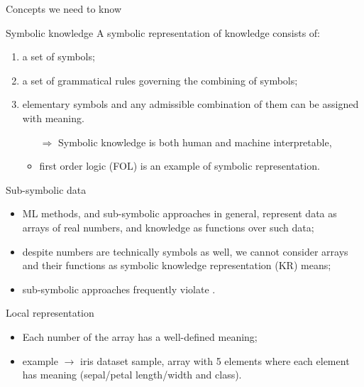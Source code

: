 \documentclass[presentation]{beamer}\mode<presentation>{\usetheme{AMSBolognaFC}}
\begin{document}
\begin{frame}[allowframebreaks]{Concepts we need to know}

    \begin{block}{Symbolic knowledge}
        A symbolic representation of knowledge consists of: 
        \begin{enumerate}
            \item a set of symbols;
            \item\label{item:symbolic-combination} a set of grammatical rules governing the combining of symbols; 
            \item\label{item:symbolic-assignment} elementary symbols and any admissible combination of them can be assigned with meaning.
            \begin{itemize}
                \item[$\Rightarrow$] Symbolic knowledge is both human and machine interpretable,
                \item first order logic (FOL) is an example of symbolic representation.
            \end{itemize}
        \end{enumerate}
    \end{block}
    
    \framebreak

    \begin{block}{Sub-symbolic data}
    \begin{itemize}
        \item ML methods, and sub-symbolic approaches in general, represent data as arrays of real numbers, and knowledge as functions over such data;
        \item despite numbers are technically symbols as well, we cannot consider arrays and their functions as symbolic knowledge representation (KR) means;
        \item sub-symbolic approaches frequently violate .
    \end{itemize}
    \end{block}
    
    \framebreak
    
    \begin{block}{Local representation}
        \begin{itemize}
            \item Each number of the array has a well-defined meaning;
            \item example $\rightarrow$ iris dataset sample, array with 5 elements where each element has meaning (sepal/petal length/width and class).
        \end{itemize}    
    \end{block}


\end{frame}
\end{document}
